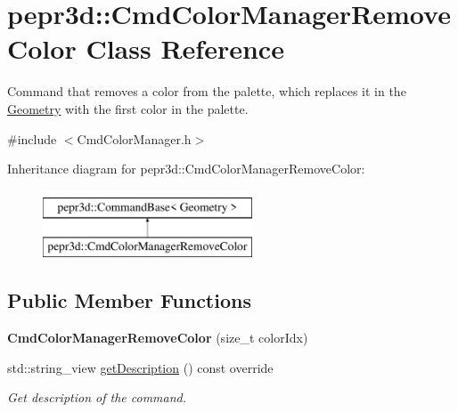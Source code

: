\hypertarget{classpepr3d_1_1_cmd_color_manager_remove_color}{}\section{pepr3d\+::Cmd\+Color\+Manager\+Remove\+Color Class Reference}
\label{classpepr3d_1_1_cmd_color_manager_remove_color}


Command that removes a color from the palette, which replaces it in the \mbox{\hyperlink{classpepr3d_1_1_geometry}{Geometry}} with the first color in the palette.  




{\ttfamily \#include $<$Cmd\+Color\+Manager.\+h$>$}

Inheritance diagram for pepr3d\+::Cmd\+Color\+Manager\+Remove\+Color\+:\begin{figure}[H]
\begin{center}
\leavevmode
\includegraphics[height=2.000000cm]{classpepr3d_1_1_cmd_color_manager_remove_color}
\end{center}
\end{figure}
\subsection*{Public Member Functions}
\begin{DoxyCompactItemize}
\item 
\mbox{\label{classpepr3d_1_1_cmd_color_manager_remove_color_ac905fef841b2873ee1959e044411e402}} 
{\bfseries Cmd\+Color\+Manager\+Remove\+Color} (size\+\_\+t color\+Idx)
\item 
\mbox{\label{classpepr3d_1_1_cmd_color_manager_remove_color_aa43776157afafd9ae0f31a12927525a6}} 
std\+::string\+\_\+view \mbox{\hyperlink{classpepr3d_1_1_cmd_color_manager_remove_color_aa43776157afafd9ae0f31a12927525a6}{get\+Description}} () const override
\begin{DoxyCompactList}\small\item\em Get description of the command. \end{DoxyCompactList}\end{DoxyCompactItemize}
